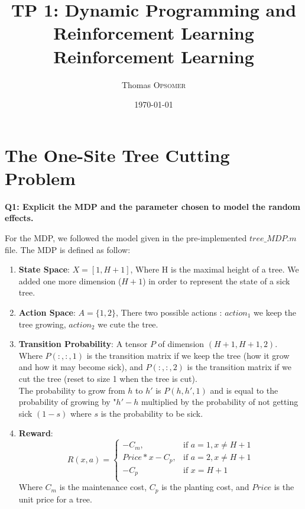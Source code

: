 \documentclass[a4paper,11pt]{exam}
\title{TP 1: Dynamic Programming and Reinforcement Learning \\ Reinforcement Learning} %
\author{Thomas \textsc{Opsomer}} %
\date{\today} %
\begin{document}
\maketitle %




\section{The One-Site Tree Cutting Problem}

\textbf{Q1: Explicit the MDP and the parameter chosen to model the random effects.\\}

For the MDP, we followed the model given in the pre-implemented $tree\_MDP.m$ file. The MDP is defined as follow:
\begin{enumerate}
\item \textbf{State Space}: $X = [1, H + 1]$, Where H is the maximal height of a tree. We added one more dimension ($H + 1$) in order to represent the state of a sick tree.
\item \textbf{Action Space}: $A = \{1, 2\}$, There two possible actions : $action_1$ we keep the tree growing, $action_2$ we cute the tree.
\item \textbf{Transition Probability}: A tensor $P$ of dimension $(H+1, H+1, 2)$. Where $P(:, :, 1)$ is the transition matrix if we keep the tree (how it grow and how it may become sick), and $P(:, :, 2)$ is the transition matrix if we cut the tree (reset to size 1 when the tree is cut).\\
The probability to grow from $h$ to $h'$ is $P(h, h', 1)$ and is equal to the probability of growing by "$h' -h$ multiplied by the probability of not getting sick $(1 - s)$ where $s$ is the probability to be sick.  
\item \textbf{Reward}: 
\[
    R(x, a)= 
\begin{cases}
    -C_{m},& \text{if } a = 1, x \neq H+1\\
    Price * x - C_{p},              & \text{if } a = 2, x \neq H+1\\
    -C_{p} 		& \text{if } x = H+1\\
\end{cases}
\]
Where $C_{m}$ is the maintenance cost, $C_{p}$ is the planting cost, and $Price$ is the unit price for a tree.

\end{enumerate}
\end{document}
